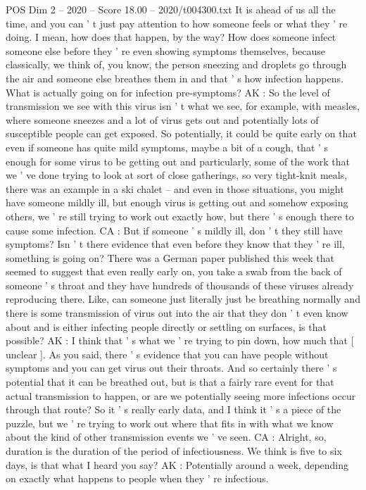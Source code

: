 \begin{textsample}{POS Dim 2 – 2020 – Score 18.00 – 2020/t004300.txt}
It is ahead of us all the time, and you can ' t just pay attention to how someone feels or what they ' re doing.
I mean, how does that happen, by the way?
How does someone infect someone else before they ' re even showing symptoms themselves, because classically, we think of, you know, the person sneezing and droplets go through the air and someone else breathes them in and that ' s how infection happens.
What is actually going on for infection pre-symptoms?
AK : So the level of transmission we see with this virus isn ' t what we see, for example, with measles, where someone sneezes and a lot of virus gets out and potentially lots of susceptible people can get exposed.
So potentially, it could be quite early on that even if someone has quite mild symptoms, maybe a bit of a cough, that ' s enough for some virus to be getting out and particularly, some of the work that we ' ve done trying to look at sort of close gatherings, so very tight-knit meals, there was an example in a ski chalet -- and even in those situations, you might have someone mildly ill, but enough virus is getting out and somehow exposing others, we ' re still trying to work out exactly how, but there ' s enough there to cause some infection.
CA : But if someone ' s mildly ill, don ' t they still have symptoms?
Isn ' t there evidence that even before they know that they ' re ill, something is going on?
There was a German paper published this week that seemed to suggest that even really early on, you take a swab from the back of someone ' s throat and they have hundreds of thousands of these viruses already reproducing there.
Like, can someone just literally just be breathing normally and there is some transmission of virus out into the air that they don ' t even know about and is either infecting people directly or settling on surfaces, is that possible?
AK : I think that ' s what we ' re trying to pin down, how much that [ unclear ].
As you said, there ' s evidence that you can have people without symptoms and you can get virus out their throats.
And so certainly there ' s potential that it can be breathed out, but is that a fairly rare event for that actual transmission to happen, or are we potentially seeing more infections occur through that route?
So it ' s really early data, and I think it ' s a piece of the puzzle, but we ' re trying to work out where that fits in with what we know about the kind of other transmission events we ' ve seen.
CA : Alright, so, duration is the duration of the period of infectiousness.
We think is five to six days, is that what I heard you say?
AK : Potentially around a week, depending on exactly what happens to people when they ' re infectious.

\end{textsample}
